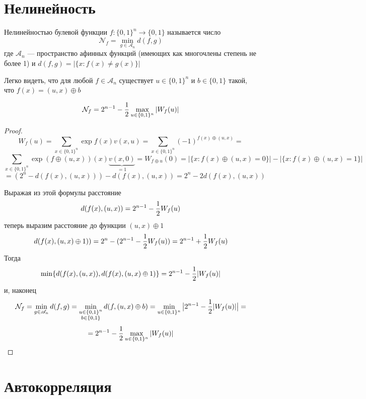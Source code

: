 
\section{Нелинейность}
\begin{definition}
Нелинейностью булевой функции $f: \{0,1\}^n \to \{0,1\}$ называется число
   $$\mathcal{N}_f = \min\limits_{g \in \mathscr{A}_n} d(f,g)$$
 где $\mathscr{A}_n$ --- пространство афинных функций (имеющих как многочлены степень не более 1) и
  $d(f,g) = |\{x \colon f(x) \neq g(x)\}|$
\end{definition}

\begin{note}
Легко видеть, что для любой $f \in \mathscr{A}_n$ существует $u \in \{0,1\}^n$ и 
$b \in \{0,1\}$ такой, что $f(x) = (u,x) \oplus b$
\end{note}

\begin{theorem}
$$\mathcal{N}_f = 2^{n-1} - {1 \over 2} \max\limits_{u \in \{0,1\}^n} |W_f(u)|$$
\end{theorem}
\begin{proof}
\[
W_f(u) = \sum\limits_{x \in \{0,1\}^n} \exp f(x) v(x,u) = 
\sum\limits_{x \in \{0,1\}^n} (-1)^{f(x) \oplus (u,x)} = 
\]
\[
\sum\limits_{x \in \{0,1\}^n} \exp (f\oplus (u,x))(x) \underbrace{v(x,0)}_{=1} = W_{f \oplus u} (0)
= |\{x \colon f(x)\oplus (u,x) = 0\}| - |\{x \colon f(x)\oplus (u,x) = 1\}| 
\]
\[
=  (2^n - d(f(x), (u,x))) - d(f(x), (u,x)) = 2^n - 2 d(f(x), (u,x))
\]

Выражая из этой формулы расстояние 
$$ d(f(x), (u,x)) = 2^{n-1} - {1 \over 2} W_f(u)$$
теперь выразим расстояние до функции $(u,x) \oplus 1$
$$d(f(x), (u,x) \oplus 1)) = 2^n - (2^{n-1} - {1 \over 2} W_f(u)) = 2^{n-1} + {1 \over 2} W_f(u)$$
Тогда 
$$\min \{d(f(x), (u,x)), d(f(x), (u,x) \oplus 1)\} = 2^{n-1} - {1 \over 2} |W_f(u)|$$
и, наконец 
$$\mathcal{N}_f = \min\limits_{g \in \mathscr{A}_n} d(f,g)
 = \min\limits_{\substack{u \in \{0,1\}^n \\ b \in \{0,1\}}} d(f,(u,x)\oplus b) = 
 \min\limits_{u \in \{0,1\}^n} \big|2^{n-1} - {1 \over 2} |W_f(u)|\big| =$$
 $$ = 2^{n-1} - {1 \over 2} \max\limits_{u \in \{0,1\}^n} |W_f(u)|$$
\end{proof}

\section{Автокорреляция}

